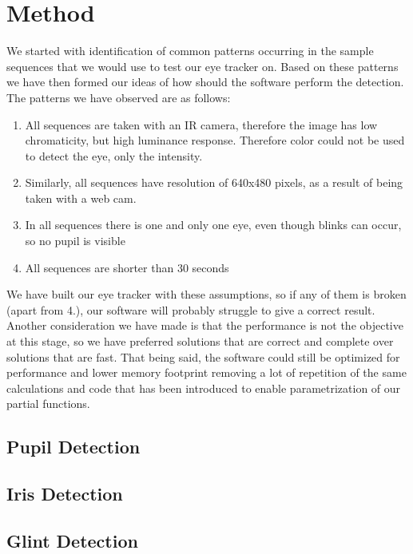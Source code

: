 \section{Method}

We started with identification of common patterns occurring in the sample sequences that we would use to test our eye tracker on. Based on these patterns we have then formed our ideas of how should the software perform the detection. The patterns we have observed are as follows:

\begin{enumerate}

\item All sequences are taken with an IR camera, therefore the image has low chromaticity, but high luminance response. Therefore color could not be used to detect the eye, only the intensity.
\item Similarly, all sequences have resolution of 640x480 pixels, as a result of being taken with a web cam.
\item In all sequences there is one and only one eye, even though blinks can occur, so no pupil is visible
\item All sequences are shorter than 30 seconds

\end{enumerate}

We have built our eye tracker with these assumptions, so if any of them is broken (apart from 4.), our software will probably struggle to give a correct result. Another consideration we have made is that the performance is not the objective at this stage, so we have preferred solutions that are correct and complete over solutions that are fast. That being said, the software could still be optimized for performance and lower memory footprint removing a lot of repetition of the same calculations and code that has been introduced to enable parametrization of our partial functions.

\subsection{Pupil Detection}

\subsection{Iris Detection}

\subsection{Glint Detection}